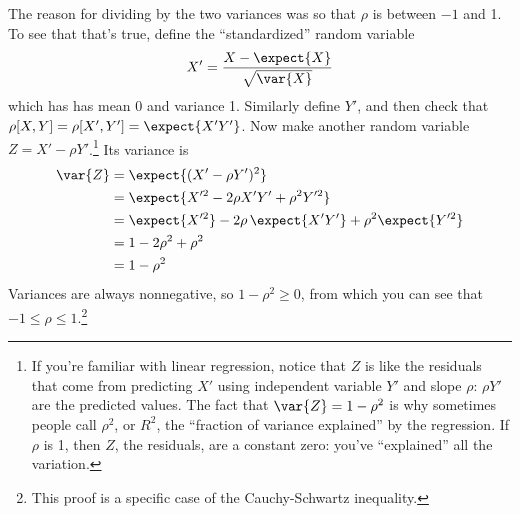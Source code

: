 The reason for dividing by the two variances was so that $\rho$ is between
$-1$ and 1. To see that that's true, define the ``standardized'' random
variable \begin{equation} X' = \frac{X - \expect{X}}{\sqrt{\var{X}}}
\end{equation} which has has mean 0 and variance 1. Similarly define $Y'$, and
then check that $\rho[X, Y] = \rho[X', Y'] = \expect{X'Y'}$. Now make another
random variable $Z = X' - \rho Y'$.\footnote{If you're familiar with linear
regression, notice that $Z$ is like the residuals that come from predicting
$X'$ using independent variable $Y'$ and slope $\rho$: $\rho Y'$ are the
predicted values. The fact that $\var{Z} = 1 - \rho^2$ is why sometimes people
call $\rho^2$, or $R^2$, the ``fraction of variance explained'' by the
regression. If $\rho$ is 1, then $Z$, the residuals, are a constant zero:
you've ``explained'' all the variation.} Its variance is
\begin{align*}
\var{Z} &= \expect{(X' - \rho Y')^2} \\
  &= \expect{X'^2 - 2 \rho X' Y' + \rho^2 Y'^2} \\
  &= \expect{X'^2} - 2\rho\,\expect{X'Y'} + \rho^2 \expect{Y'^2} \\
  &= 1 - 2\rho^2 + \rho^2 \\
  &= 1 - \rho^2
\end{align*}
Variances are always nonnegative, so $1 - \rho^2 \geq 0$, from which you can see
that $-1 \leq \rho \leq 1$.\footnote{This proof is a specific case of the
Cauchy-Schwartz inequality.}
